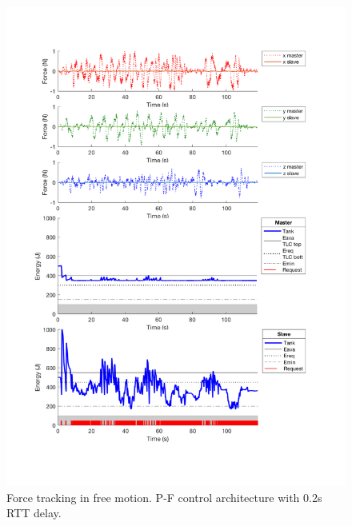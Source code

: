 \begin{center}
	\begin{figure}
		\includegraphics[width=\textwidth, keepaspectratio]{plots/pfFreeDelay/Force.pdf}
		\caption{Force tracking in free motion. P-F control architecture with 0.2s RTT delay.}
		\label{graph:pfFreeDelay/Force}
	\end{figure}
\end{center}
\newpage

